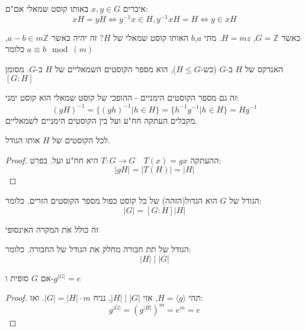 \documentclass{tstextbook}
\begin{document}
\begin{proposition}
איברים \(x,y \in G\) באותו קוסט שמאלי אם"ם:
$$xH=yH \iff y^{-1}x \in H ,y^{-1}xH=H \iff y\in xH$$

\end{proposition}
\begin{example}
כאשר \(G=\mathbb{Z}\), \(H=mz\). מתי \(a\),\(b\) האותו קוסט שמאלי של \(H\)? זה יהיה כאשר \(a-b \in m\mathbb Z\), כלומר \(a\equiv b\mod(m)\)

\end{example}
\begin{definition}[אינדקס]
האנדקס של \(H\) ב-\(G\) (כש-\(H\leq G\)), הוא מספר הקוסטים השמאליים של \(H\) ב-\(G\). מסומן \([G:H]\)

\end{definition}
\begin{remark}
זה גם מספר הקוסטים הימניים - ההופכי של קוסט שמאלי הוא קוסט ימני:
$$(gH)^{-1}=\{ (gh)^{-1} \big| h\in H \}=\{ h^{-1}g^{-1} \big|h\in H \}=Hg^{-1}$$
מקבלים העתקה חח"ע ועל בין הקוסטים הימניים לשמאליים.

\end{remark}
\begin{proposition}
לכל הקוסטים של \(H\) אותו הגודל. 

\end{proposition}
\begin{proof}
ההעתקה \(T:G\to G\quad T(x)=gx\) היא חח"ע ועל. בפרט:
$$|gH|=|T(H)|=|H|$$

\end{proof}
\begin{corollary}
הגודל של \(G\) הוא הגדול(הזהה) של כל קוסט כפול מספר הקוסטים הזרים. כלומר:
$$\boxed{|G|=[G:H]|H|}
$$

\end{corollary}
\begin{remark}
זה כולל את המקרה האינסופי

\end{remark}
\begin{theorem}[לגרנג']
הגודל של תת חבורה מחלק את הגודל של החבורה. כלומר:
$$|H| \;\big|\;|G|$$

\end{theorem}
\begin{corollary}
אם \(G\) סופית ו-\(g^{|G|}=e\)

\end{corollary}
\begin{proof}
תהי \(H=\langle g\rangle\), אזי \(|H| \;\big|\;|G|\), נניח \(|G|=|H|\cdot m\). ואז:
$$g^{|G|}=(g^{|H|})^m=e^m=e$$

\end{proof}
\end{document}
